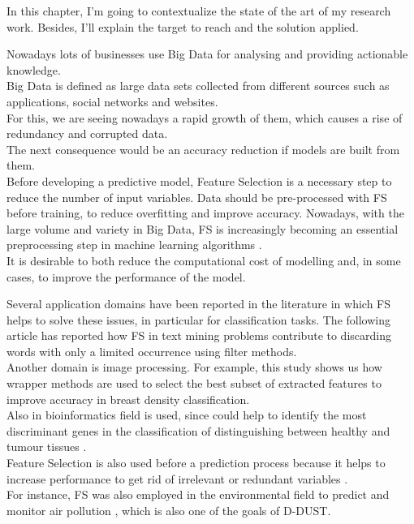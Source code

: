 In this chapter, I'm going to contextualize the state of the art of my research work. 
Besides, I'll explain the target to reach and the solution applied.\par
Nowadays lots of businesses use Big Data for analysing and providing actionable knowledge.\\
Big Data is defined as large data sets collected from different sources such as applications, social networks and websites.\\
For this, we are seeing nowadays a rapid growth of them, which causes a rise of redundancy and corrupted data.\\
The next consequence would be an accuracy reduction if models are built from them.\\
Before developing a predictive model, Feature Selection is a necessary step to reduce the number of input variables.
Data should be pre-processed with FS before training, to reduce overfitting and improve accuracy.
\newline
Nowadays, with the large volume and variety in Big Data, FS is increasingly becoming an essential preprocessing step in machine learning algorithms \cite{kamolov2021feature}.\\
It is desirable to both reduce the computational cost of modelling and, in some cases, to improve the performance of the model.\par
Several application domains have been reported in the literature in which FS helps to solve these issues, in particular for classification tasks.
The following article \cite{forman2003extensive} has reported how FS in text mining problems contribute to discarding words with only a limited occurrence using filter methods.\\
Another domain is image processing. For example, this study  \cite{muvstra2012breast} shows us how wrapper methods are used to select the best subset of extracted features to improve accuracy in breast density classification.\\
Also in bioinformatics field is used, since could help to identify the most discriminant genes in the classification of distinguishing between healthy and tumour tissues \cite{dessi2013comparative}.\\
Feature Selection is also used before a prediction process because it helps to increase performance to get rid of irrelevant or redundant variables \cite{bagherzadeh2016tutorial}.\\  
For instance, FS was also employed in the environmental field to predict and monitor air pollution \cite{ul2022improving}, which is also one of the goals of D-DUST. 

